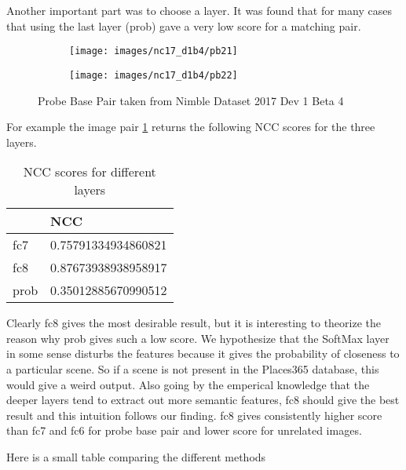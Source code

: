 \documentclass{article}
\begin{document}
Another important part was to choose a layer. It was found that for many cases that using the last layer (prob) gave a very low score for a matching pair.

\begin{figure}[H]
  \centering
  \begin{subfigure}[t]{0.5\textwidth}
    \centering
    \texttt{[image: images/nc17\_d1b4/pb21]}
  \end{subfigure}
  \begin{subfigure}[t]{0.45\textwidth}
    \centering
    \texttt{[image: images/nc17\_d1b4/pb22]}
  \end{subfigure}
  \caption{Probe Base Pair taken from Nimble Dataset 2017 Dev 1 Beta 4}
  \label{fig:fc8_good}
\end{figure}

For example the image pair \ref{fig:fc8_good} returns the following NCC scores for the three layers.
\begin{table}[H]
\centering
\caption{NCC scores for different layers}
\label{my-label}
\begin{tabular}{|l|l|}
  \hline
  & NCC                 \\
  \hline
  fc7  & 0.75791334934860821 \\
  fc8  & 0.87673938938958917 \\
  prob & 0.35012885670990512 \\
  \hline
\end{tabular}
\end{table}

Clearly fc8 gives the most desirable result, but it is interesting to theorize the reason why prob gives such a low score. We hypothesize that the SoftMax layer in some sense disturbs the features because it gives the probability of closeness to a particular scene. So if a scene is not present in the Places365 database, this would give a weird output. Also going by the emperical knowledge that the deeper layers tend to extract out more semantic features, fc8 should give the best result and this intuition follows our finding. fc8 gives consistently higher score than fc7 and fc6 for probe base pair and lower score for unrelated images.

Here is a small table comparing the different methods
\end{document}
